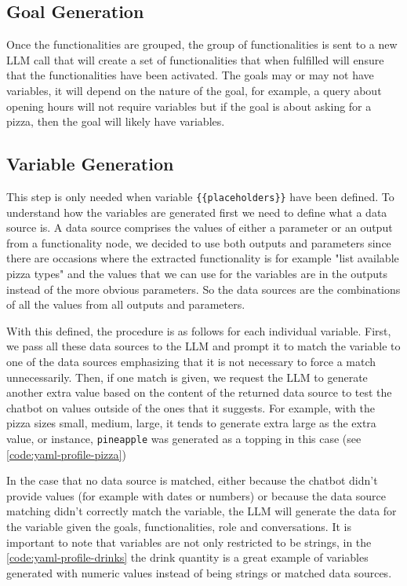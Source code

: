\subsection{Goal Generation}

Once the functionalities are grouped,
the group of functionalities is sent to a new \ac{LLM} call
that will create a set of functionalities that when fulfilled
will ensure that the functionalities have been activated.
The goals may or may not have variables,
it will depend on the nature of the goal,
for example, a query about opening hours will not require variables
but if the goal is about asking for a pizza,
then the goal will likely have variables.

\subsection{Variable Generation}

This step is only needed when variable \texttt{\{\{placeholders\}\}} have been defined.
To understand how the variables are generated
first we need to define what a data source is.
A data source comprises the values of either a parameter or an output from a functionality node,
we decided to use both outputs and parameters since there are occasions
where the extracted functionality is for example "list available pizza types"
and the values that we can use for the variables
are in the outputs instead of the more obvious parameters.
So the data sources are the combinations of all the values
from all outputs and parameters.

With this defined, the procedure is as follows for each individual variable.
First, we pass all these data sources to the \ac{LLM}
and prompt it to match the variable to one of the data sources
emphasizing that it is not necessary to force a match unnecessarily.
Then, if one match is given,
we request the \ac{LLM} to generate another extra value
based on the content of the returned data source
to test the chatbot on values outside of the ones that it suggests.
For example, with the pizza sizes small, medium, large,
it tends to generate extra large as the extra value,
or instance, \texttt{pineapple} was generated as a topping in this case
(see \autoref{code:yaml-profile-pizza})

In the case that no data source is matched,
either because the chatbot didn't provide values
(for example with dates or numbers)
or because the data source matching didn't correctly match the variable,
the \ac{LLM} will generate the data for the variable given
the goals, functionalities, role and conversations.
It is important to note that variables are not only restricted to be strings,
in the \autoref{code:yaml-profile-drinks} the drink quantity
is a great example of variables generated
with numeric values instead of being strings or matched data sources.

